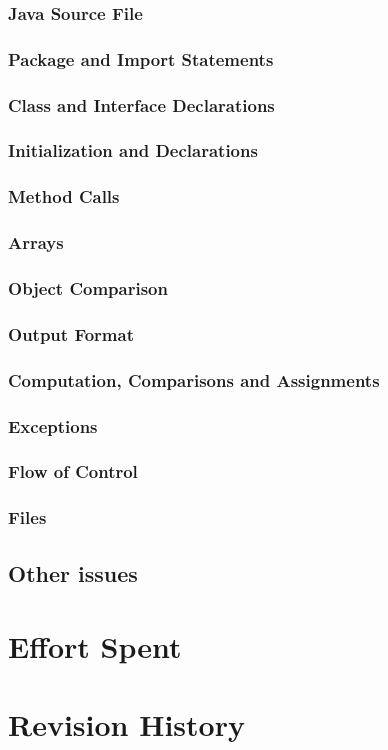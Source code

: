\documentclass[11pt,a4paper]{report}
\begin{document}
\subsection{Java Source File}
\subsection{Package and Import Statements}
\subsection{Class and Interface Declarations}
\subsection{Initialization and Declarations}
\subsection{Method Calls}
\subsection{Arrays}
\subsection{Object Comparison}
\subsection{Output Format}
\subsection{Computation, Comparisons and Assignments}
\subsection{Exceptions}
\subsection{Flow of Control}
\subsection{Files}
\section{Other issues}
\chapter{Effort Spent}
\chapter{Revision History}
\end{document}
